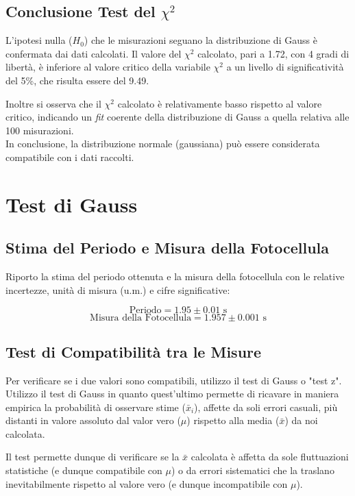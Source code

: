 \documentclass{article}
\begin{document}
\subsection{Conclusione Test del $\chi^2$}
L'ipotesi nulla ($H_0$) che le misurazioni seguano la distribuzione di Gauss è confermata dai dati calcolati. Il valore del $\chi^2$ calcolato, pari a 1.72, con 4 gradi di libertà, è inferiore al valore critico della variabile $\chi^2$ a un livello di significatività del 5\%, che risulta essere del 9.49.

Inoltre si osserva che il $\chi^2$ calcolato è relativamente basso rispetto al valore critico, indicando un \textit{fit} coerente della distribuzione di Gauss a quella relativa alle 100 misurazioni. 
\\In conclusione, la distribuzione normale (gaussiana) può essere considerata compatibile con i dati raccolti.

\section{Test di Gauss}
\subsection{Stima del Periodo e Misura della Fotocellula}

Riporto la stima del periodo ottenuta e la misura della fotocellula con le relative incertezze, unità di misura (u.m.) e cifre significative:

\[ \text{Periodo} = 1.95 \pm 0.01\text{ s} \]
\[ \text{Misura della Fotocellula} = 1.957 \pm 0.001 \text{ s} \]

\subsection{Test di Compatibilità tra le Misure}

Per verificare se i due valori sono compatibili, utilizzo il test di Gauss o "test z".\\
Utilizzo il test di Gauss in quanto quest'ultimo permette di ricavare in maniera empirica la probabilità di osservare stime ($\bar{x}_i$), affette da soli errori casuali, più distanti in valore assoluto dal valor vero ($\mu$) rispetto alla media ($\bar{x}$) da noi calcolata. 

Il test permette dunque di verificare se la $\bar{x}$ calcolata è affetta da sole fluttuazioni statistiche (e dunque compatibile con $\mu$) o da errori sistematici che la traslano inevitabilmente rispetto al valore vero (e dunque incompatibile con $\mu$). \\
\end{document}
